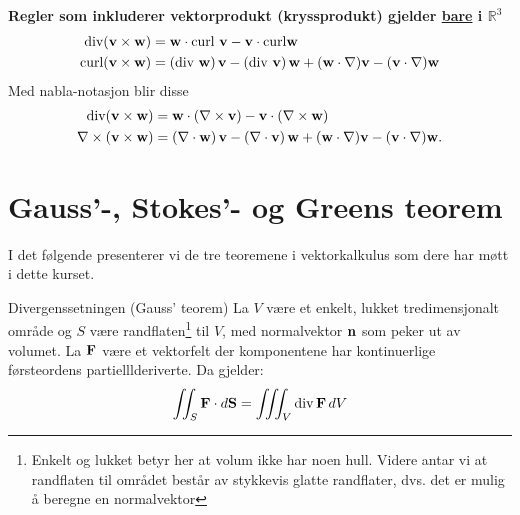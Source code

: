 \textbf{Regler som inkluderer vektorprodukt (kryssprodukt) gjelder \underline{bare} i \( \mathbb{R}^3 \)}
\begin{align*}
\text{div}(\mathbf{v} \times \mathbf{w}) &= \mathbf{w} \cdot \text{curl } \mathbf{v} - \mathbf{v} \cdot \text{curl} \mathbf{w}  \\
 \text{curl}(\mathbf{v} \times \mathbf{w}) &= (\text{div } \mathbf{w})\, \mathbf{v} - (\text{div } \mathbf{v})\, \mathbf{w} + (\mathbf{w} \cdot \nabla)\mathbf{v} - (\mathbf{v} \cdot \nabla)\mathbf{w} 
 \end{align*}
 Med nabla-notasjon blir disse
 \begin{align*}
\text{div}(\mathbf{v} \times \mathbf{w}) &= \mathbf{w} \cdot (\nabla\times\mathbf{v}) - \mathbf{v} \cdot (\nabla\times\mathbf{w})  \\
 \nabla\times(\mathbf{v} \times \mathbf{w}) &= (\nabla\cdot \mathbf{w})\, \mathbf{v} - (\nabla\cdot \mathbf{v})\, \mathbf{w} + (\mathbf{w} \cdot \nabla)\mathbf{v} - (\mathbf{v} \cdot \nabla)\mathbf{w}.
 \end{align*}


\newpage
\section{Gauss'-, Stokes'- og Greens teorem}\label{app:vectKalk}
I det følgende presenterer vi de tre teoremene i vektorkalkulus som dere har møtt i dette kurset.

\begin{oppsum}{Divergenssetningen (Gauss' teorem)}
La \( V \) være et enkelt, lukket tredimensjonalt område og \( S \) være randflaten\footnote{Enkelt og lukket betyr her at volum ikke har noen hull. Videre antar vi at randflaten til området består av stykkevis glatte randflater, dvs. det er mulig å beregne en normalvektor} til \( V \), med normalvektor $\mathbf{n}$ som peker ut av volumet. La \( \mathbf{F} \) være et vektorfelt der komponentene har kontinuerlige førsteordens partielllderiverte. Da gjelder:
\[
\iint_S \mathbf{F} \cdot d\mathbf{S} = \iiint_V \mathrm{div} \, \mathbf{F} \, dV
\]
\end{oppsum}

